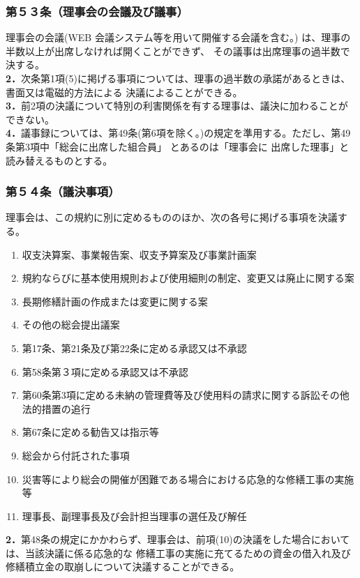 \documentclass[
  luatex,
  paper=a4paper,
  fontsize=11pt,
  jafontsize=11pt,
  jlreq_notes,
]{jlreq}
\begin{document}
  \subsubsection*{第５３条（理事会の会議及び議事）}
  理事会の会議(WEB 会議システム等を用いて開催する会議を含む。) は、理事の半数以上が出席しなければ開くことができず、
  その議事は出席理事の過半数で決する。\\
  \textbf{2．}次条第1項(5)に掲げる事項については、理事の過半数の承諾があるときは、書面又は電磁的方法による
  決議によることができる。\\
  \textbf{3．}前2項の決議について特別の利害関係を有する理事は、議決に加わることができない。\\
  \textbf{4．}議事録については、第49条(第6項を除く。)の規定を準用する。ただし、第49条第3項中「総会に出席した組合員」
  とあるのは「理事会に 出席した理事」と読み替えるものとする。\\
  \subsubsection*{第５４条（議決事項）}
  理事会は、この規約に別に定めるもののほか、次の各号に掲げる事項を決議する。
  \begin{enumerate}
  \item 収支決算案、事業報告案、収支予算案及び事業計画案
  \item 規約ならびに基本使用規則および使用細則の制定、変更又は廃止に関する案
  \item 長期修繕計画の作成または変更に関する案
  \item その他の総会提出議案
  \item 第17条、第21条及び第22条に定める承認又は不承認
  \item 第58条第３項に定める承認又は不承認
  \item 第60条第3項に定める未納の管理費等及び使用料の請求に関する訴訟その他法的措置の追行
  \item 第67条に定める勧告又は指示等
  \item 総会から付託された事項
  \item 災害等により総会の開催が困難である場合における応急的な修繕工事の実施等
  \item 理事長、副理事長及び会計担当理事の選任及び解任
  \end{enumerate}
  \textbf{2．}第48条の規定にかかわらず、理事会は、前項(10)の決議をした場合においては、当該決議に係る応急的な
  修繕工事の実施に充てるための資金の借入れ及び修繕積立金の取崩しについて決議することができる。
\end{document}
